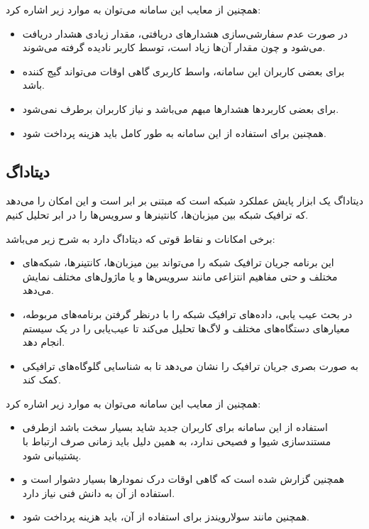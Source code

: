 همچنین از معایب این سامانه می‌توان به موارد زیر اشاره کرد:



\begin{itemize}
    \item در صورت عدم سفارشی‌سازی هشدارهای دریافتی، مقدار زیادی هشدار دریافت می‌شود و چون مقدار آن‌ها زیاد است، توسط کاربر نادیده گرفته می‌شوند.
    \item برای بعضی کاربران این سامانه، واسط کاربری گاهی اوقات می‌تواند گیج کننده باشد.
    \item برای بعضی کاربردها هشدارها مبهم می‌باشد و نیاز کاربران برطرف نمی‌شود.
    \item همچنین برای استفاده از این سامانه به طور کامل باید هزینه پرداخت شود.
\end{itemize}


\subsection{دیتاداگ}

دیتاداگ یک ابزار پایش عملکرد شبکه است که مبتنی بر ابر است و این امکان را می‌دهد که ترافیک شبکه بین میزبان‌ها، کانتینرها و سرویس‌ها را در ابر تحلیل کنیم.

\newpage
برخی امکانات و نقاط قوتی که دیتاداگ دارد به شرح زیر می‌باشد:

\begin{itemize}
    \item این برنامه جریان ترافیک شبکه را می‌تواند بین میزبان‌ها، کانتینرها، شبکه‌های مختلف و حتی مفاهیم انتزاعی مانند سرویس‌ها و یا ماژول‌های مختلف نمایش می‌دهد. 
    \item در بحث عیب یابی، داده‌های ترافیک شبکه را با درنظر گرفتن برنامه‌های مربوطه، معیارهای دستگاه‌های مختلف و لاگ‌ها تحلیل می‌کند تا عیب‌یابی را در یک سیستم انجام دهد.
    \item به صورت بصری جریان ترافیک را نشان می‌دهد تا به شناسایی گلوگاه‌های ترافیکی کمک کند.
\end{itemize}

همچنین از معایب این سامانه می‌توان به موارد زیر اشاره کرد:


\begin{itemize}
    \item استفاده از این سامانه برای کاربران جدید شاید بسیار سخت باشد ازطرفی مستندسازی شیوا و فصیحی ندارد، به همین دلیل باید زمانی صرف ارتباط با پشتیبانی شود.
    \item همچنین گزارش شده است که گاهی اوقات درک نمودارها بسیار دشوار است و استفاده از آن به دانش فنی نیاز دارد.
    \item همچنین مانند سولارویندز برای استفاده از آن، باید هزینه پرداخت شود.
\end{itemize}


